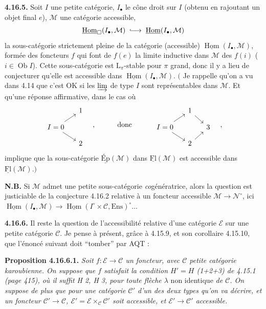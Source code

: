 \documentclass[11pt]{article}
\newcommand{\printedpage}[1]{\marginpar{\footnotesize p.~#1}}
\newcommand{\msp}[1]{\marginpar{\footnotesize [#1]}}
\newcommand{\Ob}{\operatorname{Ob}}
\newcommand{\Hom}{\operatorname{Hom}}
\newcommand{\Ens}{\mathrm{Ens}}
\newcommand{\into}{\lhook\joinrel\longrightarrow}
\begin{document}
\textbf{4.16.5.} Soit $I$ une petite catégorie, $I_\bullet$ le cône droit sur $I$ (obtenu en rajoutant un objet final $e$), $\mathcal{M}$ une catégorie accessible,
\[
\underline{\Hom}_{\square}(I_\bullet,\mathcal{M}) \;\into\; \underline{\Hom}(I_\bullet,\mathcal{M})
\]
la sous-catégorie strictement pleine de la catégorie (accessible) $\underline{\Hom}(I_\bullet,\mathcal{M})$, formée des foncteurs $f$ qui font de $f(e)$ la limite inductive dans $\mathcal{M}$ des $f(i)$ ($i \in \Ob I$). Cette sous-catégorie est $\mathrm{L}_\pi$-stable pour $\pi$ grand, donc il y a lieu
\msp{473}
de conjecturer qu'elle est accessible dans $\underline{\Hom}(I_\bullet,\mathcal{M})$. $\Big($ Je rappelle qu'on a vu dans 4.14 que c'est OK si les $\varinjlim$ de type $I$ sont représentables dans $\mathcal{M}$. Et qu'une réponse affirmative, dans le cas où
\printedpage{183}
\[
\begin{tikzcd}[row sep=small, column sep=small]
 & 1 \\
I = 0 \arrow[ur] \arrow[dr] & \\
 & 2
\end{tikzcd}
\quad ,\qquad\quad \text{donc} \qquad\quad
\begin{tikzcd}[row sep=small, column sep=small]
 & 1 \arrow[dr] & \\
I = 0 \arrow[ur] \arrow[dr] & & 3 \\
 & 2 \arrow[ur] &
\end{tikzcd}
\quad ,
\]
implique que la sous-catégorie $\underline{\text{Ép}}(\mathcal{M})$ dans $\underline{\mathrm{Fl}}(\mathcal{M})$ est accessible dans $\underline{\mathrm{Fl}}(\mathcal{M})$.$\Big)$

\textbf{N.B.} Si $\mathcal{M}$ admet une petite sous-catégorie \textit{co}génératrice, alors la question est justiciable de la conjecture 4.16.2 relative à un foncteur accessible $\mathcal{M} \longrightarrow \mathcal{N}^\circ$, ici $\underline{\Hom}(I_\bullet,\mathcal{M}) \longrightarrow \underline{\Hom}(I^\circ \times \mathcal{C},\Ens)^\circ \dots$

\textbf{4.16.6.} Il reste la question de l'accessibilité relative d'une catégorie $\mathcal{E}$ sur une petite catégorie $\mathcal{C}$. Je pense à présent, grâce à 4.15.9, et son corollaire 4.15.10, que l'énoncé suivant doit “tomber” par AQT :

\textbf{Proposition 4.16.6.1.} \textit{Soit $f : \mathcal{E} \longrightarrow \mathcal{C}$ un foncteur, avec $\mathcal{C}$ petite catégorie karoubienne. On suppose que $f$ satisfait la condition $H' = H$ (1+2+3) de 4.15.1 (page 415), où il suffit H 2, H 3, pour toute flèche $\lambda$} non identique \textit{de $\mathcal{C}$. On suppose de plus que pour une catégorie $\mathcal{C}'$ d'un des deux types qu'on va décrire, et un foncteur $\mathcal{C}' \longrightarrow \mathcal{C}$, $\mathcal{E}' = \mathcal{E} \times_{\mathcal{C}} \mathcal{C}'$ soit accessible, et $\mathcal{E}' \longrightarrow \mathcal{C}'$ accessible.}
\end{document}
